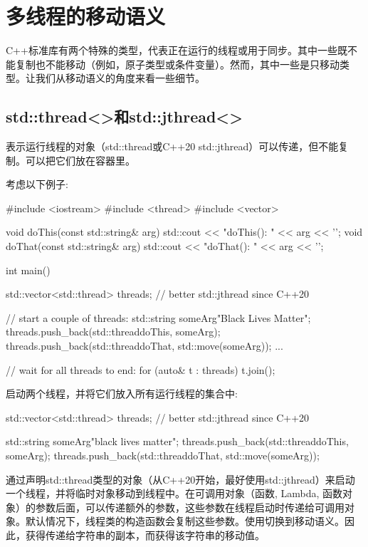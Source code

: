 \section{多线程的移动语义}
C++标准库有两个特殊的类型，代表正在运行的线程或用于同步。其中一些既不能复制也不能移动（例如，原子类型或条件变量）。然而，其中一些是只移动类型。让我们从移动语义的角度来看一些细节。

\subsection{std::thread<>和std::jthread<>}

表示运行线程的对象（std::thread或C++20 std::jthread）可以传递，但不能复制。可以把它们放在容器里。

考虑以下例子:

\begin{cppcode}
#include <iostream>
#include <thread>
#include <vector>

void doThis(const std::string& arg) {
	std::cout << "doThis(): " << arg << '\n';
}
void doThat(const std::string& arg) {
	std::cout << "doThat(): " << arg << '\n';
}

int main()
{
	std::vector<std::thread> threads; // better std::jthread since C++20

	// start a couple of threads:
	std::string someArg{"Black Lives Matter"};
	threads.push_back(std::thread{doThis, someArg});
	threads.push_back(std::thread{doThat, std::move(someArg)});
	...

	// wait for all threads to end:
	for (auto& t : threads) {
		t.join();
	}
}
\end{cppcode}

启动两个线程，并将它们放入所有运行线程的集合中:

\begin{cppcode}
std::vector<std::thread> threads; // better std::jthread since C++20

std::string someArg{"black lives matter"};
threads.push_back(std::thread{doThis, someArg});
threads.push_back(std::thread{doThat, std::move(someArg)});
\end{cppcode}

通过声明std::thread类型的对象（从C++20开始，最好使用std::jthread）来启动一个线程，并将临时对象移动到线程中。在可调用对象（函数, Lambda, 函数对象）的参数后面，可以传递额外的参数，这些参数在线程启动时传递给可调用对象。默认情况下，线程类的构造函数会复制这些参数。使用切换到移动语义。因此，获得传递给字符串的副本，而获得该字符串的移动值。

